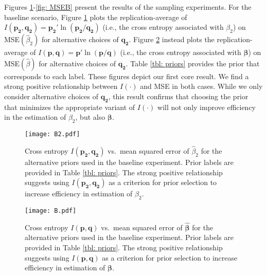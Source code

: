 \documentclass{elsarticle}
\begin{document}
Figures \ref{fig: B1}-\ref{fig: MSEB} present the results of the sampling experiments.
For the baseline scenario, Figure \ref{fig: B1} plots the replication-average of 
$I(\mathbf{p_2}, \mathbf{q_2}) = \mathbf{p_2}'\ln (\mathbf{p_2}/
\mathbf{q_2})$ (i.e., the cross entropy associated with $\beta_2$) on 
MSE$(\hat{\beta}_2)$ for alternative choices of $\mathbf{q_2}$.
Figure \ref{fig: B} instead plots the replication-average of 
$I(\mathbf{p}, \mathbf{q}) = \mathbf{p}'\ln (\mathbf{p}/
\mathbf{q})$ (i.e., the cross entropy associated with $\mathbf{\beta}$) on 
MSE$(\hat{\beta})$  for alternative choices of $\mathbf{q_2}$.
Table \ref{tbl: priors} provides the prior that corresponds to each label.
These figures depict our first core result.
We find a strong positive relationship between $I(\cdot)$ and MSE in both cases.
While we only consider alternative choices of $\mathbf{q_2}$, this result 
confirms that choosing the prior that minimizes the appropriate variant of $I(\cdot)$ will 
not only improve efficiency in the estimation of $\beta_2$, but also $\mathbf{\beta}$.

\begin{figure}[htbp]
\centering
\texttt{[image: B2.pdf]}
\caption{Cross entropy $I(\mathbf{p_2}, \mathbf{q_2})$ vs.\  mean squared
error of $\hat{\beta}_2$ for the alternative priors used in the baseline experiment.
Prior labels are provided in Table \ref{tbl: priors}.
The strong positive relationship suggests using $I(\mathbf{p_2}, \mathbf{q_2})$
as a criterion  for prior selection to increase efficiency in estimation of 
$\beta_2$.}
\label{fig: B1}
\end{figure}

\begin{figure}[htbp]
\centering
\texttt{[image: B.pdf]}
\caption{Cross entropy $I(\mathbf{p}, \mathbf{q})$ vs.\  mean squared
error of $\mathbf{\hat{\beta}}$ for the alternative priors used in the baseline experiment.
Prior labels are provided in Table \ref{tbl: priors}.
The strong positive relationship suggests using $I(\mathbf{p}, \mathbf{q})$
as a criterion for prior selection to increase efficiency in estimation of 
$\mathbf{\beta}$.}
\label{fig: B}
\end{figure}
\end{document}

